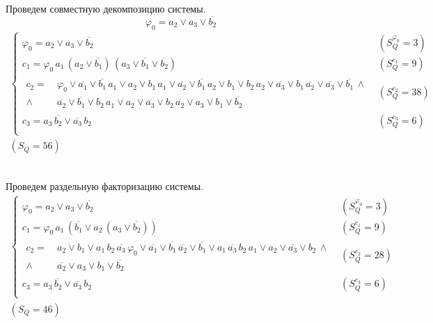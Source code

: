 \documentclass{article}
\begin{document}
\noindent\begin{minipage}{\textwidth}
Проведем совместную декомпозицию системы. \[\varphi_{0} = a_2 \lor a_3 \lor \overline{b_2}\]
\[\begin{matrix}
    \begin{cases}
        \varphi_{0} = a_2 \lor a_3 \lor \overline{b_2} & (S_Q^{\varphi_{0}} = 3) \\
        c_1 = \varphi_{0}\,a_1\,\left(a_2 \lor \overline{b_1}\right)\,\left(a_3 \lor \overline{b_1} \lor \overline{b_2}\right) & (S_Q^{c_1} = 9) \\
        \begin{aligned}c_2 =\: &\varphi_{0} \lor \overline{a_1} \lor \overline{b_1}\, a_1 \lor a_2 \lor b_1\, a_1 \lor \overline{a_2} \lor \overline{b_1}\, a_2 \lor b_1 \lor b_2\, a_2 \lor \overline{a_3} \lor b_1\, \overline{a_2} \lor \overline{a_3} \lor \overline{b_1}\,\land \\ \land \: &\overline{a_2} \lor \overline{b_1} \lor b_2\, a_1 \lor a_2 \lor \overline{a_3} \lor b_2\, \overline{a_2} \lor a_3 \lor b_1 \lor \overline{b_2}\end{aligned} & (S_Q^{c_2} = 38) \\
        c_3 = a_3\,\overline{b_2} \lor \overline{a_3}\,b_2 & (S_Q^{c_3} = 6) \\
    \end{cases} \\ (S_Q = 56)
\end{matrix}\] \\ \phantom{0}
\end{minipage}
\noindent\begin{minipage}{\textwidth}
Проведем раздельную факторизацию системы.
\[\begin{matrix}
    \begin{cases}
        \varphi_{0} = a_2 \lor a_3 \lor \overline{b_2} & (S_Q^{\varphi_{0}} = 3) \\
        c_1 = \varphi_{0}\,a_1\,\left(\overline{b_1} \lor a_2\,\left(a_3 \lor \overline{b_2}\right)\right) & (S_Q^{c_1} = 9) \\
        \begin{aligned}c_2 =\: &a_2 \lor b_1 \lor a_1\,b_2\,\overline{a_3}\, \varphi_{0} \lor \overline{a_1} \lor \overline{b_1}\, \overline{a_2} \lor \overline{b_1} \lor a_1\,\overline{a_3}\,b_2\, a_1 \lor a_2 \lor \overline{a_3} \lor b_2\,\land \\ \land \: &\overline{a_2} \lor a_3 \lor b_1 \lor \overline{b_2}\end{aligned} & (S_Q^{c_2} = 28) \\
        c_3 = a_3\,\overline{b_2} \lor \overline{a_3}\,b_2 & (S_Q^{c_3} = 6) \\
    \end{cases} \\ (S_Q = 46)
\end{matrix}\] \\ \phantom{0}
\end{minipage}
\end{document}

